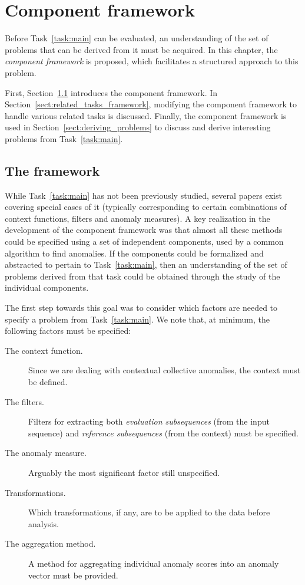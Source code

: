 \section{Component framework}
\label{sect:component_framework}

Before Task~\ref{task:main} can be evaluated, an understanding of the set of problems that can be derived from it must be acquired. In this chapter, the \emph{component framework} is proposed, which facilitates a structured approach to this problem.

First, Section~\ref{sect:framework} introduces the component framework. In Section~\ref{sect:related_tasks_framework}, modifying the component framework to handle various related tasks is discussed. Finally, the component framework is used in Section~\ref{sect:deriving_problems} to discuss and derive interesting problems from Task~\ref{task:main}.

\subsection{The framework}
\label{sect:framework}

While Task~\ref{task:main} has not been previously studied, several papers exist covering special cases of it (typically corresponding to certain combinations of context functions, filters and anomaly measures). A key realization in the development of the component framework was that almost all these methods could be specified using a set of independent components, used by a common algorithm to find anomalies. If the components could be formalized and abstracted to pertain to Task~\ref{task:main}, then an understanding of the set of problems derived from that task could be obtained through the study of the individual components.

The first step towards this goal was to consider which factors are needed to specify a problem from Task~\ref{task:main}. We note that, at minimum, the following factors must be specified:

\begin{description}
  \item[The context function.] Since we are dealing with contextual collective anomalies, the context must be defined.
  \item[The filters.] Filters for extracting both \emph{evaluation subsequences} (from the input sequence) and \emph{reference subsequences} (from the context) must be specified.
  \item[The anomaly measure.] Arguably the most significant factor still unspecified.
  \item[Transformations.] Which transformations, if any, are to be applied to the data before analysis.
  \item[The aggregation method.] A method for aggregating individual anomaly scores into an anomaly vector must be provided.
\end{description}

